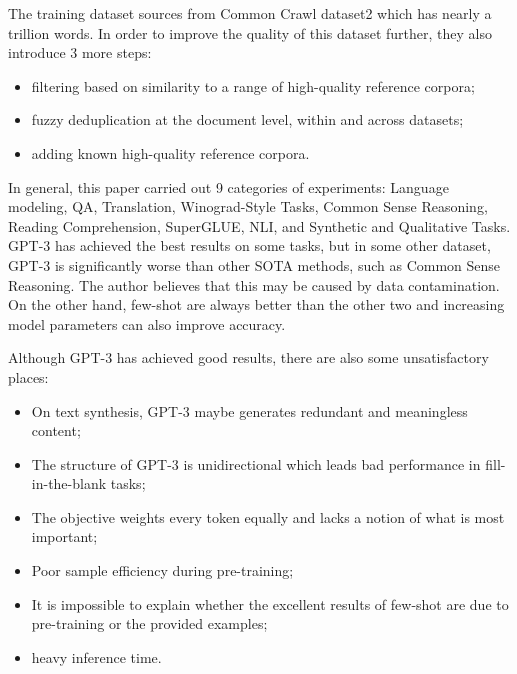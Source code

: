 \documentclass{article}
\begin{document}
The training dataset sources from Common Crawl dataset2 which has nearly a trillion words. In order to improve the quality of this dataset further, they also introduce 3 more steps:
\begin{itemize}
   \item filtering based on similarity to a range of high-quality reference corpora;
   \item fuzzy deduplication at the document level, within and across datasets;
   \item adding known high-quality reference corpora.
\end{itemize}

In general, this paper carried out 9 categories of experiments: Language modeling, QA, Translation, Winograd-Style Tasks, Common Sense Reasoning, Reading Comprehension, SuperGLUE, NLI, and Synthetic and Qualitative Tasks. GPT-3 has achieved the best results on some tasks, but in some other dataset, GPT-3 is significantly worse than other SOTA methods, such as Common Sense Reasoning. The author believes that this may be caused by data contamination. On the other hand, few-shot are always better than the other two and increasing model parameters can also improve accuracy.

Although GPT-3 has achieved good results, there are also some unsatisfactory places:
\begin{itemize}
  \item On text synthesis, GPT-3 maybe generates redundant and meaningless content;
  \item The structure of GPT-3 is unidirectional which leads bad performance in fill-in-the-blank tasks;
  \item The objective weights every token equally and lacks a notion of what is most important;
  \item Poor sample efficiency during pre-training;
  \item It is impossible to explain whether the excellent results of few-shot are due to pre-training or the provided examples;
  \item heavy inference time.
\end{itemize}
\end{document}
